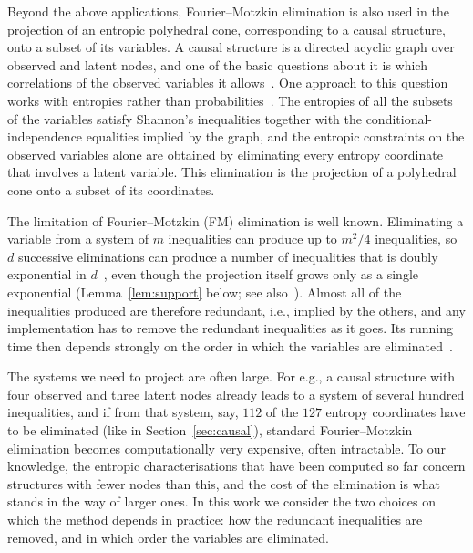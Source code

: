 \documentclass[11pt]{article}
\theoremstyle{definition}
\begin{document}
Beyond the above applications, Fourier--Motzkin elimination is also used in the projection of an entropic polyhedral cone, corresponding to a causal structure, onto a subset of its variables. A causal structure is a directed acyclic graph over observed and latent nodes, and one of the basic questions about it is which correlations of the observed variables it allows~\cite{pearl2009,hlp2014,khanna2024}. One approach to this question works with entropies rather than probabilities~\cite{braunstein1988,fritzchaves2013,chaves2014,chaves2015,weilenmann2017}. The entropies of all the subsets of the variables satisfy Shannon's inequalities together with the conditional-independence equalities implied by the graph, and the entropic constraints on the observed variables alone are obtained by eliminating every entropy coordinate that involves a latent variable. This elimination is the projection of a polyhedral cone onto a subset of its coordinates. 

The limitation of Fourier--Motzkin (FM) elimination is well known. Eliminating a variable from a system of $m$ inequalities can produce up to $m^2/4$ inequalities, so $d$ successive eliminations can produce a number of inequalities that is doubly exponential in $d$~\cite{duffin1974,huynh1992}, even though the projection itself grows only as a single exponential (Lemma~\ref{lem:support} below; see also~\cite{monniaux2010}). Almost all of the inequalities produced are therefore redundant, i.e., implied by the others, and any implementation has to remove the redundant inequalities as it goes. Its running time then depends strongly on the order in which the variables are eliminated~\cite{huynh1992,simonking2005}.

The systems we need to project are often large. For e.g., a causal structure with four observed and three latent nodes already leads to a system of several hundred inequalities, and if from that system, say, $112$ of the $127$ entropy coordinates have to be eliminated (like in Section~\ref{sec:causal}), standard Fourier--Motzkin elimination becomes computationally very expensive, often intractable. To our knowledge, the entropic characterisations that have been computed so far concern structures with fewer nodes than this, and the cost of the elimination is what stands in the way of larger ones. In this work we consider the two choices on which the method depends in practice: how the redundant inequalities are removed, and in which order the variables are eliminated.
\end{document}
